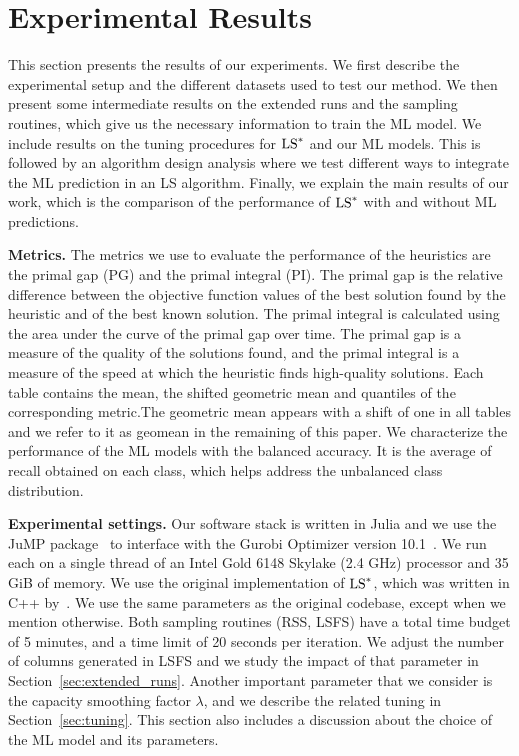 \documentclass[3p, authoryear, times, doubleblind]{elsarticle}
\begin{document}
{\section{Experimental Results} \label{sec:results}

This section presents the results of our experiments. We first describe the experimental setup and the different datasets used to test our method. We then present some intermediate results on the extended runs and the sampling routines, which give us the necessary information to train the ML model. We include results on the tuning procedures for $\text{LS}^*$ and our ML models. This is followed by an algorithm design analysis where we test different ways to integrate the ML prediction in an LS algorithm. Finally, we explain the main results of our work, which is the comparison of the performance of $\text{LS}^*$ with and without ML predictions.


\textbf{Metrics. } The metrics we use to evaluate the performance of the heuristics are the primal gap (PG) and the primal integral (PI). The primal gap is the relative difference between the objective function values of the best solution found by the heuristic and of the best known solution. The primal integral is calculated using the area under the curve of the primal gap over time. The primal gap is a measure of the quality of the solutions found, and the primal integral is a measure of the speed at which the heuristic finds high-quality solutions. Each table contains the mean, the shifted geometric mean and quantiles of the corresponding metric.\startblue The geometric mean appears with a shift of one in all tables and we refer to it as geomean in the remaining of this paper.   We characterize the performance of the ML models with the balanced accuracy. It is the average of recall obtained on each class, which helps address the unbalanced class distribution. \stopblue

\textbf{Experimental settings. } Our software stack is written in Julia and we use the JuMP package~\citep{lubin_jump_2023} to interface with the Gurobi Optimizer version 10.1~\citep{gurobi}.  We run each  on a single thread of an Intel Gold 6148 Skylake (2.4 GHz) processor and 35 GiB of memory. We use the original implementation of $\text{LS}^*$, which was written in C++ by~\cite{katayama_mip_2020}. \startblue We use the same parameters as the original codebase, except when we mention otherwise. Both sampling routines (RSS, LSFS) have a total time budget of 5 minutes, and a time limit of 20 seconds per iteration. We adjust the number of columns generated in LSFS and we study the impact of that parameter in Section~\ref{sec:extended_runs}. Another important parameter that we consider is the capacity smoothing factor $\lambda$, and we describe the related tuning in Section~\ref{sec:tuning}. This section also includes a discussion about the choice of the ML model and its parameters. 
\stopblue 


}
\end{document}
